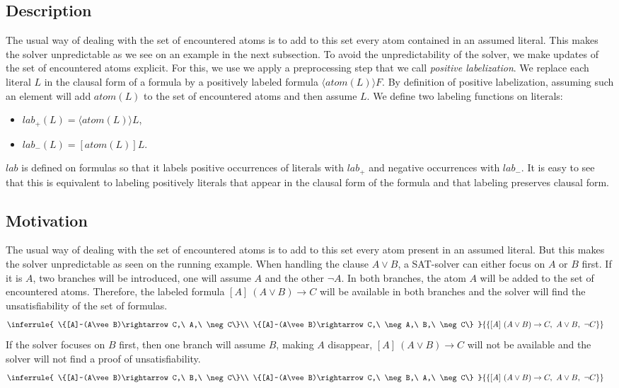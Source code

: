 \documentclass[a4paper,11pt]{article}
\newcommand{\atom}{\mathit{atom}}
\newcommand{\T}{\mathit{lab}}
\begin{document}
\subsection{Description}
The usual way of dealing with the set of encountered atoms is to add to this set every atom
contained in an assumed literal. This makes the solver unpredictable as we see on an example in
the next subsection.
To avoid the unpredictability of the solver, we make updates of the set of encountered atoms explicit.
For this, we use we apply a preprocessing step that we call \emph{positive labelization}.
We replace each literal $L$ in the clausal form of a formula
by a positively labeled formula $\langle\atom(L)\rangle F$. By definition of positive labelization,
assuming such an element will add $\atom(L)$ to the set of encountered atoms and then assume $L$.
We define two labeling functions on literals:
\begin{itemize}
 \item $\T_+(L)=\langle\atom(L)\rangle L$,
 \item $\T_-(L)=[\atom(L)]L$.
\end{itemize}
$\T$ is defined on formulas so that it labels positive occurrences of literals with $\T_+$ and
negative occurrences with $\T_-$. It is easy to see that this is equivalent to labeling
positively literals that appear in the clausal form of the formula and that labeling preserves
clausal form.
\subsection{Motivation}
The usual way of dealing with the set of encountered atoms is to add to this set every atom present
in an assumed literal. But this makes the solver unpredictable as seen on the running
example. When handling the clause $A\vee B$, a SAT-solver can either focus on $A$ or $B$ first. If it is
$A$, two branches will be introduced, one will assume $A$ and the other $\neg A$. In both branches,
the atom $A$ will be added to the set of encountered atoms. Therefore, the labeled formula
$[A]~(A\vee B)\rightarrow C$ will be available in both branches and the solver will find the unsatisfiability
of the set of formulas.
\begin{eqnarray*}
&
\inferrule{
\{[A]~(A\vee B)\rightarrow C,\ A,\ \neg C\}\\
\{[A]~(A\vee B)\rightarrow C,\ \neg A,\ B,\ \neg C\}
}{\{[A]~(A\vee B)\rightarrow C,\ A\vee B,\ \neg C\}}
\end{eqnarray*}
If the solver focuses on $B$ first, then one branch will assume $B$, making
$A$ disappear, $[A]~(A\vee B)\rightarrow C$ will not be available and the solver will not find
a proof of unsatisfiability.
\begin{eqnarray*}
&
\inferrule{
\{[A]~(A\vee B)\rightarrow C,\ B,\ \neg C\}\\
\{[A]~(A\vee B)\rightarrow C,\ \neg B,\ A,\ \neg C\}
}{\{[A]~(A\vee B)\rightarrow C,\ A\vee B,\ \neg C\}}
\end{eqnarray*}
\end{document}

